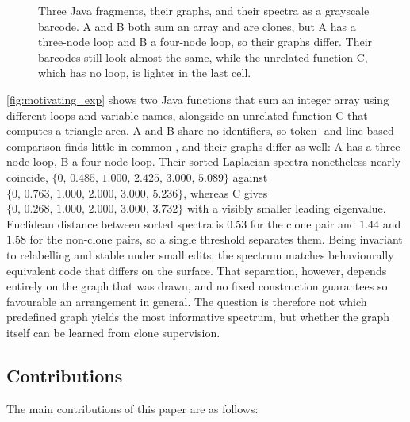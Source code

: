 \documentclass[final,5p,times,twocolumn]{elsarticle}
\theoremstyle{plain}
\begin{document}
\begin{figure}[t]
\caption{Three Java fragments, their graphs, and their spectra as a
grayscale barcode. A and B both sum an array and are clones, but A has a
three-node loop and B a four-node loop, so their graphs differ. Their
barcodes still look almost the same, while the unrelated function C, which
has no loop, is lighter in the last cell.}
\label{fig:motivating_exp}
\end{figure}

\autoref{fig:motivating_exp} shows two Java functions that sum an integer
array using different loops and variable names, alongside an unrelated
function C that computes a triangle area. A and B share no identifiers, so
token- and line-based comparison finds little in common
\cite{roy2007survey,alomari2020semanticclonebench}, and their graphs differ
as well: A has a three-node loop, B a four-node loop. Their sorted Laplacian
spectra nonetheless nearly coincide,
$\{0,\,0.485,\,1.000,\,2.425,\,3.000,\,5.089\}$ against
$\{0,\,0.763,\,1.000,\,2.000,\,3.000,\,5.236\}$, whereas C gives
$\{0,\,0.268,\,1.000,\,2.000,\,3.000,\,3.732\}$ with a visibly smaller
leading eigenvalue. Euclidean distance between sorted spectra is $0.53$ for
the clone pair and $1.44$ and $1.58$ for the non-clone pairs, so a single
threshold separates them. Being invariant to relabelling and stable under
small edits, the spectrum matches behaviourally equivalent code that differs
on the surface. {That separation, however, depends entirely on the graph
that was drawn, and no fixed construction guarantees so favourable an
arrangement in general. The question is therefore not which predefined graph
yields the most informative spectrum, but whether the graph itself can be
learned from clone supervision.}

\subsection{Contributions}
\label{subsec:contributions}
The main contributions of this paper are as follows:
\end{document}

